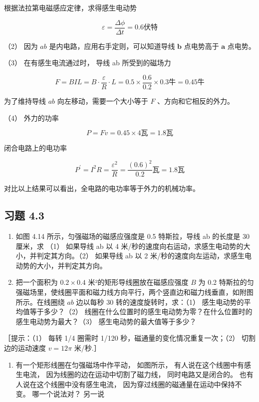 根据法拉第电磁感应定律，求得感生电动势

\[
\varepsilon = \frac{\Delta \phi}{\Delta t} = 0.6 \text{伏特}
\]

（2） 因为 \(ab\) 是内电路，应用右手定则，可以知道导线 \(\pmb{b}\)
点电势高于 \(\pmb{a}\) 点电势。

（3） 在有感生电流通过时， 导线 ab 所受到的磁场力

\[
F = B I L = B \cdot \frac{\varepsilon}{R} \cdot L = 0.5 \times \frac{0.6}{0.2} \times 0.3 \text{牛} = 0.45 \text{牛}
\]

为了维持导线 \(ab\) 向左移动，需要一个大小等于 \(F\)
、方向和它相反的外力。

（4） 外力的功率

\[
P = F v = 0.45 \times 4 \text{瓦} = 1.8 \text{瓦}
\]

闭合电路上的电功率

\[
P^{\prime} = I^{2} R = \frac{\varepsilon^{2}}{R} = \frac{(0.6)^{2}}{0.2} \text{瓦} = 1.8 \text{瓦}
\]

对比以上结果可以看出，全电路的电功率等于外力的机械功率。

\subsection{习题 4.3}\label{ux4e60ux9898-4.3}

\begin{enumerate}
\def\labelenumi{\arabic{enumi}.}
\item
  如图 4.14 所示，匀强磁场的磁感应强度是 0.5 特斯拉，导线 ab 的长度是 30
  厘米，求 （1） 如果导线 ab 以 4
  米/秒的速度向右运动，求感生电动势的大小，并判定其方向。（2） 如果导线
  ab 以 2 米/秒的速度向左运动，求感生电动势的大小，并判定其方向。
\item
  把一个面积为 \(0.2 \times 0.4\) 米²的矩形导线圈放在磁感应强度 \(B\) 为
  0.2
  特斯拉的匀强磁场里，使线圈平面和磁力线方向平行，两个竖直边和磁力线垂直，如附图所示。在线圈绕
  \(ab\) 边以每秒 30 转的速度旋转时，求：（1）
  感生电动势的平均值等于多少？（2）
  线圈在什么位置时的感生电动势为零？在什么位置时的感生电动势为最大？（3）
  感生电动势的最大值等于多少？
\end{enumerate}

［提示：（1） 每转 1/4 圈需时 1/120 秒，磁通量的变化情况重复一次；（2）
切割边的运动速度 \(v = 12\pi\) 米/秒.］

\begin{enumerate}
\def\labelenumi{\arabic{enumi}.}
\setcounter{enumi}{2}
\tightlist
\item
  有一个矩形线圈在匀强磁场中作平动， 如图所示，
  有人说在这个线圈中有感生电流， 因为线圈的边在运动中切割了磁力线，
  同时电路又是闭合的。 也有人说在这个线圈中没有感生电流，
  因为穿过线圈的磁通量在运动中保持不变。 哪一个说法对？ 另一说
\end{enumerate}


